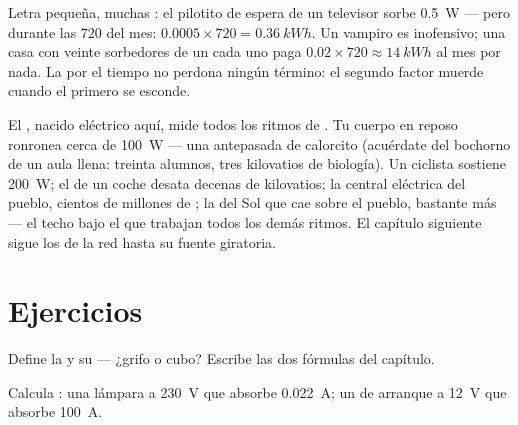 \begin{example}\label{ex:g9:electric-power-energy:standby}
Letra pequeña, muchas : el pilotito de espera de un televisor
sorbe \qty{0.5}{W} --- pero durante las $720$  del mes:
$0.0005 \times 720 = \qty{0.36}{kWh}$. Un vampiro es inofensivo; una
casa con veinte sorbedores de un  cada uno paga $0.02 \times
720 \approx \qty{14}{kWh}$ al mes por nada. La  por el
tiempo no perdona ningún término: el segundo factor muerde cuando el
primero se esconde.
\end{example}

\begin{remark}\label{rem:g9:electric-power-energy:wider}
El , nacido eléctrico aquí, mide todos los ritmos de
. Tu cuerpo en reposo ronronea cerca de \qty{100}{W} --- una
 antepasada de calorcito (acuérdate del bochorno de un aula
llena: treinta alumnos, tres kilovatios de biología). Un ciclista
sostiene \qty{200}{W}; el  de un coche desata decenas de
kilovatios; la central eléctrica del pueblo, cientos de millones de
; la  del Sol que cae sobre el pueblo, bastante más --- el
techo bajo el que trabajan todos los demás ritmos. El capítulo
siguiente sigue los  de la red hasta su fuente giratoria.
\end{remark}

\section{Ejercicios}

\begin{exercise}[$\star$]\label{exo:g9:electric-power-energy:1}
Define la  y su  --- ¿grifo o cubo? Escribe
las dos fórmulas del capítulo.
\end{exercise}

\begin{exercise}[$\star$]\label{exo:g9:electric-power-energy:2}
Calcula : una lámpara a \qty{230}{V} que absorbe
\qty{0.022}{A}; un  de arranque a \qty{12}{V} que absorbe
\qty{100}{A}.
\end{exercise}

